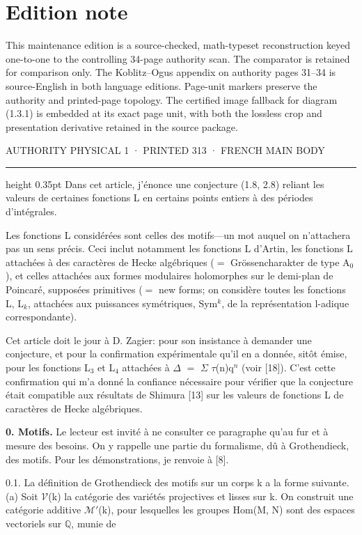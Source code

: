 \documentclass[10pt,twoside]{article}
\newcommand{\PageUnit}[3]{%
  \par\noindent\hypertarget{record-#1}{}%
  \pdfbookmark[1]{Authority page #1 · printed #2}{bookmark-#1}%
  {\sffamily\footnotesize\color{D030Muted}AUTHORITY PHYSICAL #1 · PRINTED #2 · #3}%
  \par\vspace{0.35em}\hrule height 0.35pt\vspace{0.8em}}
\newcommand{\SectionLead}[1]{\textbf{\color{D030Accent}#1}}
\begin{document}
\section*{Edition note}
This maintenance edition is a source-checked, math-typeset reconstruction keyed one-to-one to the controlling 34-page authority scan. The comparator is retained for comparison only. The Koblitz--Ogus appendix on authority pages 31--34 is source-English in both language editions. Page-unit markers preserve the authority and printed-page topology. The certified image fallback for diagram (1.3.1) is embedded at its exact page unit, with both the lossless crop and presentation derivative retained in the source package.
\clearpage
\PageUnit{1}{313}{FRENCH MAIN BODY}
Dans cet article, j’énonce une conjecture (1.8, 2.8) reliant les valeurs de certaines fonctions L en certains points entiers à des périodes d’intégrales.\par
Les fonctions L considérées sont celles des motifs—un mot auquel on n’attachera pas un sens précis. Ceci inclut notamment les fonctions L d’Artin, les fonctions L attachées à des caractères de Hecke algébriques (\ensuremath{=} Grössencharakter de type A\ensuremath{_{0}}), et celles attachées aux formes modulaires holomorphes sur le demi-plan de Poincaré, supposées primitives (\ensuremath{=} new forms; on considère toutes les fonctions L, L\ensuremath{_{k}}, attachées aux puissances symétriques, Sym\ensuremath{^{k}}, de la représentation l-adique correspondante).\par
Cet article doit le jour à D. Zagier: pour son insistance à demander une conjecture, et pour la confirmation expérimentale qu’il en a donnée, sitôt émise, pour les fonctions L\ensuremath{_{3}} et L\ensuremath{_{4}} attachées à \ensuremath{Δ} \ensuremath{=} \ensuremath{Σ} \ensuremath{τ}(n)q\ensuremath{^{n}} (voir [18]). C’est cette confirmation qui m’a donné la confiance nécessaire pour vérifier que la conjecture était compatible aux résultats de Shimura [13] sur les valeurs de fonctions L de caractères de Hecke algébriques.\par
\SectionLead{0. Motifs.} Le lecteur est invité à ne consulter ce paragraphe qu’au fur et à mesure des besoins. On y rappelle une partie du formalisme, dû à Grothendieck, des motifs. Pour les démonstrations, je renvoie à [8].\par
0.1. La définition de Grothendieck des motifs sur un corps k a la forme suivante. (a) Soit \ensuremath{𝒱}(k) la catégorie des variétés projectives et lisses sur k. On construit une catégorie additive \ensuremath{ℳ}\ensuremath{′}(k), pour lesquelles les groupes Hom(M, N) sont des espaces vectoriels sur \ensuremath{ℚ}, munie de\par
\end{document}
